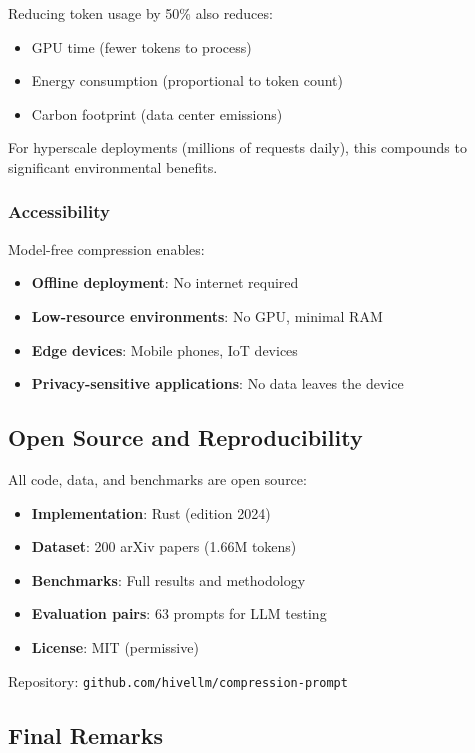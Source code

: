 Reducing token usage by 50\% also reduces:
\begin{itemize}
    \item GPU time (fewer tokens to process)
    \item Energy consumption (proportional to token count)
    \item Carbon footprint (data center emissions)
\end{itemize}

For hyperscale deployments (millions of requests daily), this compounds to significant environmental benefits.

\subsubsection{Accessibility}

Model-free compression enables:
\begin{itemize}
    \item \textbf{Offline deployment}: No internet required
    \item \textbf{Low-resource environments}: No GPU, minimal RAM
    \item \textbf{Edge devices}: Mobile phones, IoT devices
    \item \textbf{Privacy-sensitive applications}: No data leaves the device
\end{itemize}

\subsection{Open Source and Reproducibility}

All code, data, and benchmarks are open source:

\begin{itemize}
    \item \textbf{Implementation}: Rust (edition 2024)
    \item \textbf{Dataset}: 200 arXiv papers (1.66M tokens)
    \item \textbf{Benchmarks}: Full results and methodology
    \item \textbf{Evaluation pairs}: 63 prompts for LLM testing
    \item \textbf{License}: MIT (permissive)
\end{itemize}

Repository: \texttt{github.com/hivellm/compression-prompt}

\subsection{Final Remarks}

